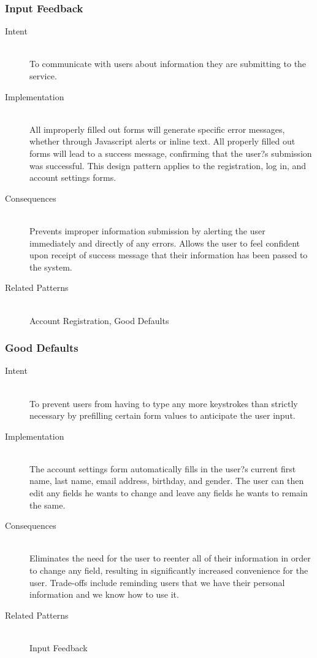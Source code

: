 		\subsubsection{Input Feedback}
			\begin{description}
				\item[Intent] \hfill \\
					To communicate with users about information they are submitting to the service.
				\item[Implementation] \hfill \\
					All improperly filled out forms will generate specific error messages, whether through Javascript alerts or inline text. All properly filled out forms will lead to a success message, confirming that the user?s submission was successful. This design pattern applies to the registration, log in, and account settings forms.
				\item[Consequences] \hfill \\
					Prevents improper information submission by alerting the user immediately and directly of any errors. Allows the user to feel confident upon receipt of success message that their information has been passed to the system.
				\item[Related Patterns] \hfill \\
					Account Registration, Good Defaults
			\end{description}
			
		\subsubsection{Good Defaults}
			\begin{description}
				\item[Intent] \hfill \\
					To prevent users from having to type any more keystrokes than strictly necessary by prefilling certain form values to anticipate the user input.
				\item[Implementation] \hfill \\
					The account settings form automatically fills in the user?s current first name, last name, email address, birthday, and gender. The user can then edit any fields he wants to change and leave any fields he wants to remain the same.
				\item[Consequences] \hfill \\
					Eliminates the need for the user to reenter all of their information in order to change any field, resulting in significantly increased convenience for the user. Trade-offs include reminding users that we have their personal information and we know how to use it.
				\item[Related Patterns] \hfill \\
					Input Feedback
			\end{description}
